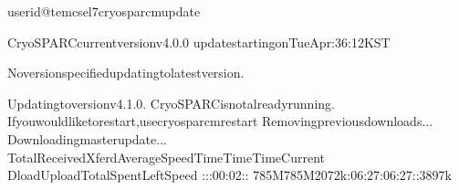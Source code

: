 \documentclass[a4paper,10pt,english]{sphinxmanual}
\begin{document}
\begin{sphinxVerbatim}[commandchars=\\\{\}]
userid@tem\PYGZhy{}cs\PYGZhy{}el7\PYGZdl{}\PYGZgt{}cryosparcmupdate

CryoSPARCcurrentversionv4.0.0
updatestartingonTueApr:36:12KST

Noversionspecified\PYGZhy{}updatingtolatestversion.

Updatingtoversionv4.1.0.
CryoSPARCisnotalreadyrunning.
Ifyouwouldliketorestart,usecryosparcmrestart
Removingpreviousdownloads...
Downloadingmasterupdate...
\PYGZpc{}Total\PYGZpc{}Received\PYGZpc{}XferdAverageSpeedTimeTimeTimeCurrent
DloadUploadTotalSpentLeftSpeed
\PYGZhy{}\PYGZhy{}:\PYGZhy{}\PYGZhy{}:\PYGZhy{}\PYGZhy{}:00:02\PYGZhy{}\PYGZhy{}:\PYGZhy{}\PYGZhy{}:\PYGZhy{}\PYGZhy{}
785M785M2072k:06:27:06:27\PYGZhy{}\PYGZhy{}:\PYGZhy{}\PYGZhy{}:\PYGZhy{}\PYGZhy{}3897k

\end{sphinxVerbatim}
\end{document}
